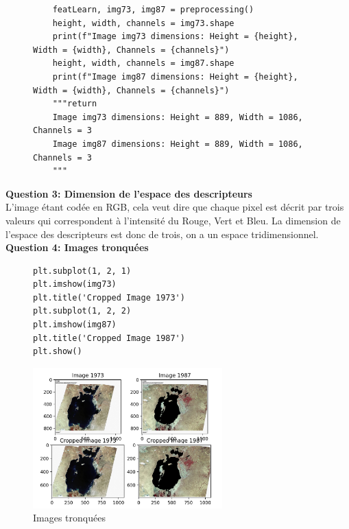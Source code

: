 \clearpage

\begin{figure}[!h]
    \begin{verbatim}
    featLearn, img73, img87 = preprocessing()
    height, width, channels = img73.shape
    print(f"Image img73 dimensions: Height = {height}, Width = {width}, Channels = {channels}")
    height, width, channels = img87.shape
    print(f"Image img87 dimensions: Height = {height}, Width = {width}, Channels = {channels}")
    """return 
    Image img73 dimensions: Height = 889, Width = 1086, Channels = 3
    Image img87 dimensions: Height = 889, Width = 1086, Channels = 3
    """
    \end{verbatim}   
\end{figure}

\textbf{Question 3: Dimension de l'espace des descripteurs} \\

L'image étant codée en RGB, cela veut dire que chaque pixel est décrit par trois valeurs qui correspondent à l'intensité du 
Rouge, Vert et Bleu. La dimension de l'espace des descripteurs est donc de trois, on a un espace tridimensionnel. \\

\textbf{Question 4: Images tronquées}

\begin{figure}[!h]
    \begin{verbatim}
plt.subplot(1, 2, 1)
plt.imshow(img73)
plt.title('Cropped Image 1973')
plt.subplot(1, 2, 2)
plt.imshow(img87)
plt.title('Cropped Image 1987')
plt.show()
    \end{verbatim}   
\end{figure}

\begin{figure}[!h]
    \begin{center}
        \includegraphics[width=0.65\textwidth]{./img/2.4.jpg}
            \caption{\label{fig:1.2}Images tronquées}  
        \end{center}
\end{figure}

\clearpage








